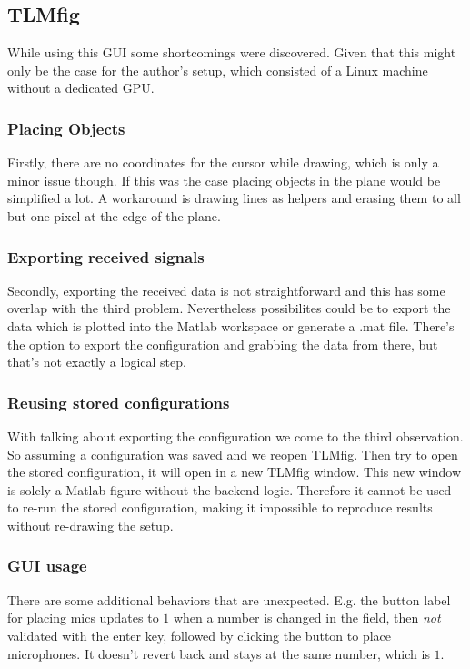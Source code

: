 \documentclass[twocolumn]{article}
\begin{document}
\subsection{TLMfig}
While using this GUI some shortcomings were discovered.
Given that this might only be the case for the author's setup, which consisted
of a Linux machine without a dedicated GPU.

\subsubsection{Placing Objects}
Firstly, there are no coordinates for the cursor while drawing, which is only
a minor issue though.
If this was the case placing objects in the plane would be simplified a lot.
A workaround is drawing lines as helpers and erasing them to all but one pixel
at the edge of the plane.

\subsubsection{Exporting received signals}
Secondly, exporting the received data is not straightforward and this has some
overlap with the third problem.
Nevertheless possibilites could be to export the data which is plotted into the
Matlab workspace or generate a .mat file.
There's the option to export the configuration and grabbing the data from there,
but that's not exactly a logical step.

\subsubsection{Reusing stored configurations}
With talking about exporting the configuration we come to the third observation.
So assuming a configuration was saved and we reopen TLMfig.
Then try to open the stored configuration, it will open in a new TLMfig window.
This new window is solely a Matlab figure without the backend logic.
Therefore it cannot be used to re-run the stored configuration, making it impossible
to reproduce results without re-drawing the setup.

\subsubsection{GUI usage}
There are some additional behaviors that are unexpected.
E.g. the button label for placing mics updates to $1$ when a number is changed in the field,
then \textit{not} validated with the enter key, followed by clicking the button to place microphones.
It doesn't revert back and stays at the same number, which is $1$.
\end{document}
